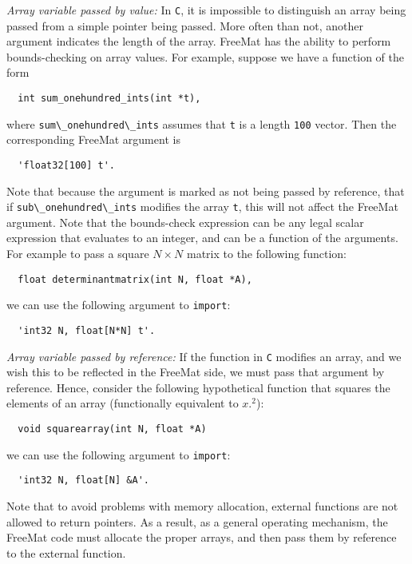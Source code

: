 \emph{Array variable passed by value:}
In \verb|C|, it is impossible to distinguish an array being passed from
a simple pointer being passed.  More often than not, another argument
indicates the length of the array.  FreeMat has the ability to perform
bounds-checking on array values.  For example, suppose we have a function
of the form
\begin{verbatim}
  int sum_onehundred_ints(int *t),
\end{verbatim}
where \verb|sum\_onehundred\_ints| assumes that \verb|t| is a length \verb|100| vector. 
Then the corresponding FreeMat argument is
\begin{verbatim}
  'float32[100] t'.
\end{verbatim}
Note that because the argument is marked as not being passed by reference,
that if \verb|sub\_onehundred\_ints| modifies the array \verb|t|, this
will not affect the FreeMat argument.  Note that the bounds-check expression
can be any legal scalar expression that evaluates to an integer, and can be
a function of the arguments.  For example to pass a square $N \times N$ 
matrix to the following function:
\begin{verbatim}
  float determinantmatrix(int N, float *A),
\end{verbatim}
we can use the following argument to \verb|import|:
\begin{verbatim}
  'int32 N, float[N*N] t'.
\end{verbatim}

\emph{Array variable passed by reference:}
If the function in \verb|C| modifies an array, and we wish this to be
reflected in the FreeMat side, we must pass that argument by reference.
Hence, consider the following hypothetical function that squares the
elements of an array (functionally equivalent to $x.^2$):
\begin{verbatim}
  void squarearray(int N, float *A)
\end{verbatim}
we can use the following argument to \verb|import|:
\begin{verbatim}
  'int32 N, float[N] &A'.
\end{verbatim}
Note that to avoid problems with memory allocation, external functions
are not allowed to return pointers.  As a result, as a general operating
mechanism, the FreeMat code must allocate the proper arrays, and then
pass them by reference to the external function.

